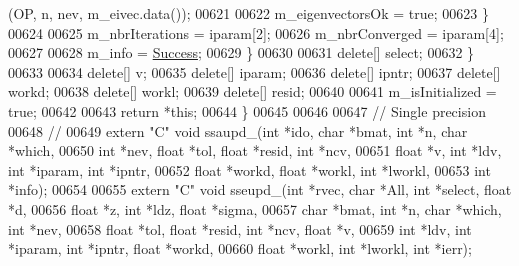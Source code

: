 \begin{DoxyCode}
      (OP, n, nev, m\_eivec.data());
00621 
00622         m\_eigenvectorsOk = \textcolor{keyword}{true};
00623       \}
00624 
00625       m\_nbrIterations = iparam[2];
00626       m\_nbrConverged  = iparam[4];
00627 
00628       m\_info = \hyperlink{group__enums_gga85fad7b87587764e5cf6b513a9e0ee5ea52581b035f4b59c203b8ff999ef5fcea}{Success};
00629     \}
00630 
00631     \textcolor{keyword}{delete}[] select;
00632   \}
00633 
00634   \textcolor{keyword}{delete}[] v;
00635   \textcolor{keyword}{delete}[] iparam;
00636   \textcolor{keyword}{delete}[] ipntr;
00637   \textcolor{keyword}{delete}[] workd;
00638   \textcolor{keyword}{delete}[] workl;
00639   \textcolor{keyword}{delete}[] resid;
00640 
00641   m\_isInitialized = \textcolor{keyword}{true};
00642 
00643   \textcolor{keywordflow}{return} *\textcolor{keyword}{this};
00644 \}
00645 
00646 
00647 \textcolor{comment}{// Single precision}
00648 \textcolor{comment}{//}
00649 \textcolor{keyword}{extern} \textcolor{stringliteral}{"C"} \textcolor{keywordtype}{void} ssaupd\_(\textcolor{keywordtype}{int} *ido, \textcolor{keywordtype}{char} *bmat, \textcolor{keywordtype}{int} *n, \textcolor{keywordtype}{char} *which,
00650     \textcolor{keywordtype}{int} *nev, \textcolor{keywordtype}{float} *tol, \textcolor{keywordtype}{float} *resid, \textcolor{keywordtype}{int} *ncv,
00651     \textcolor{keywordtype}{float} *v, \textcolor{keywordtype}{int} *ldv, \textcolor{keywordtype}{int} *iparam, \textcolor{keywordtype}{int} *ipntr,
00652     \textcolor{keywordtype}{float} *workd, \textcolor{keywordtype}{float} *workl, \textcolor{keywordtype}{int} *lworkl,
00653     \textcolor{keywordtype}{int} *info);
00654 
00655 \textcolor{keyword}{extern} \textcolor{stringliteral}{"C"} \textcolor{keywordtype}{void} sseupd\_(\textcolor{keywordtype}{int} *rvec, \textcolor{keywordtype}{char} *All, \textcolor{keywordtype}{int} *select, \textcolor{keywordtype}{float} *d,
00656     \textcolor{keywordtype}{float} *z, \textcolor{keywordtype}{int} *ldz, \textcolor{keywordtype}{float} *sigma, 
00657     \textcolor{keywordtype}{char} *bmat, \textcolor{keywordtype}{int} *n, \textcolor{keywordtype}{char} *which, \textcolor{keywordtype}{int} *nev,
00658     \textcolor{keywordtype}{float} *tol, \textcolor{keywordtype}{float} *resid, \textcolor{keywordtype}{int} *ncv, \textcolor{keywordtype}{float} *v,
00659     \textcolor{keywordtype}{int} *ldv, \textcolor{keywordtype}{int} *iparam, \textcolor{keywordtype}{int} *ipntr, \textcolor{keywordtype}{float} *workd,
00660     \textcolor{keywordtype}{float} *workl, \textcolor{keywordtype}{int} *lworkl, \textcolor{keywordtype}{int} *ierr);

\end{DoxyCode}
